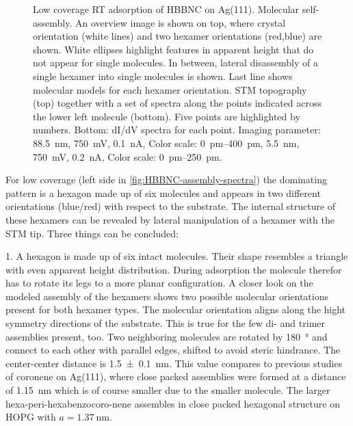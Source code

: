 \begin{figure}[]
	\caption{Low coverage RT adsorption of HBBNC on Ag(111).  Molecular self-assembly. An overview image is shown on top, where crystal orientation (white lines) and two hexamer orientations (red,blue) are shown. White ellipses highlight features in apparent height that do not appear for single molecules. In between, lateral disassembly of a single hexamer into single molecules is shown. Last line shows molecular models for each hexamer orientation.  STM topography (top) together with a set of spectra along the points indicated across the lower left molecule (bottom). Five points are highlighted by numbers. Bottom: dI/dV spectra for each point. Imaging parameter:  \SI{88.5}{\nano \meter}, \SI{750}{\milli \volt}, \SI{0.1}{\nano \ampere}, Color scale: \SIrange{0}{400}{\pico \meter},  \SI{5.5}{\nano \meter}, \SI{750}{\milli \volt}, \SI{0.2}{\nano \ampere}, Color scale: \SIrange{0}{250}{\pico \meter}.}
	\label{fig:HBBNC-assembly-spectra}
\end{figure}
For low coverage (left side in \autoref{fig:HBBNC-assembly-spectra}) the dominating pattern is a hexagon made up of six molecules and appears in two different orientations (blue/red) with respect to the substrate. The internal structure of these hexamers can be revealed by lateral manipulation of a hexamer with the STM tip. Three things can be concluded: 

1. A hexagon is made up of six intact molecules. Their shape resembles a triangle with even apparent height distribution. During adsorption the molecule therefor has to rotate its legs to a more planar configuration. A closer look on the modeled assembly of the hexamers shows two possible molecular orientations present for both hexamer types. The molecular orientation aligns along the hight symmetry directions of the substrate. This is true for the few di- and trimer assemblies present, too. Two neighboring molecules are rotated by \SI{180}{\degree} and connect to each other with parallel edges, shifted to avoid steric hindrance. The center-center distance is \SI{1.5 \pm 0.1}{\nano \meter}. This value compares to previous studies of coronene on Ag(111), where close packed assemblies were formed at a distance of \SI{1.15}{\nano \meter} which is of course smaller due to the smaller molecule.\cite{lackinger_coronene_2002} The larger  hexa-peri-hexabenzocoro-nene assembles in close packed hexagonal structure on HOPG with $a =\SI{1,37}{\nano \meter}$.\cite{samori_epitaxial_2002}


